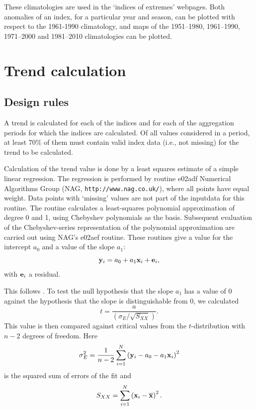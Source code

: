 \documentclass[a4paper,11pt]{article}
\begin{document}
These climatologies are used in the `indices of extremes' webpages. Both anomalies
of an index, for a particular year and season, can be plotted with respect to the
1961-1990 climatology, and maps of the 1951--1980, 1961--1990, 1971--2000 and 1981--2010 climatologies can
be plotted.


\section{Trend calculation}
\label{sec:trend}
\subsection{Design rules}
\label{sec:trendrules}

A trend is calculated for each of the indices and for each of the
aggregation periods for which the indices are calculated. Of all values considered
in a period, at least 70\% of them must contain valid index data
(i.e., not missing) for the trend to be calculated.

Calculation of the trend value is done by a least squares estimate of a simple linear regression. The regression is
performed by routine e02adf Numerical Algorithms Group (NAG, {\tt http://www.nag.co.uk/}), 
where all points have equal weight. Data points with `missing' values are not
part of the inputdata for this routine. The routine calculates a least-squares polynomial approximation of degree 0
and 1, using Chebyshev polynomials as the basis.  Subsequent evaluation of the Chebyshev-series representation
of the polynomial approximation are carried out using NAG's e02aef routine.
These routines give a value for the intercept $a_0$ and a value of the slope $a_1$:
\begin{equation*}
{\bf y}_i = a_0 + a_1 {\bf x}_i + {\bf e}_i,
\end{equation*}
with ${\bf e}_i$ a residual.

This follows \cite[\S8.3.8]{vonstorch}. To test the null hypothesis that the slope $a_1$ has a value of 0 against
the hypothesis that the slope is distinguishable from 0, we calculated
\begin{equation*} 
t = \frac{a}{\left( \sigma_E / \sqrt{S_{XX}} \right)}.
\end{equation*}
This value is then compared against critical values from the $t$-distribution with $n - 2$ degrees of freedom.
Here
\begin{equation*}
\sigma^2_E = \frac{1}{n - 2} \sum_{i=1}^N \left( {\bf y}_i - a_0 - a_1 {\bf x}_i \right)^2
\end{equation*}
is the squared sum of errors of the fit and
\begin{equation*} 
S_{XX} = \sum_{i=1}^N \left( {\bf x}_i - \overline{\bf x} \right)^2.
\end{equation*}
\end{document}
